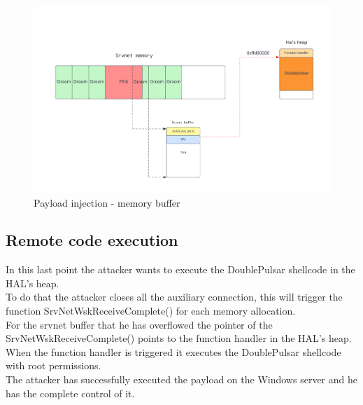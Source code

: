 \begin{figure}[ht!]
    \centering
      \includegraphics[scale=0.5]{images/exploit_6_buff.png}
      \caption{Payload injection - memory buffer}
\end{figure}

\clearpage
\subsection{Remote code execution}
In this last point the attacker wants to execute the DoublePulsar shellcode in the HAL's heap.\\
To do that the attacker closes all the auxiliary connection, this will trigger the function SrvNetWskReceiveComplete() for each memory allocation.\\
For the srvnet buffer that he has overflowed the pointer of the SrvNetWskReceiveComplete() points to the function handler in the HAL's heap. 
When the function handler is triggered it executes the DoublePulsar shellcode with root permissions.\\
The attacker has successfully executed the payload on the Windows server and he has the complete control of it.

